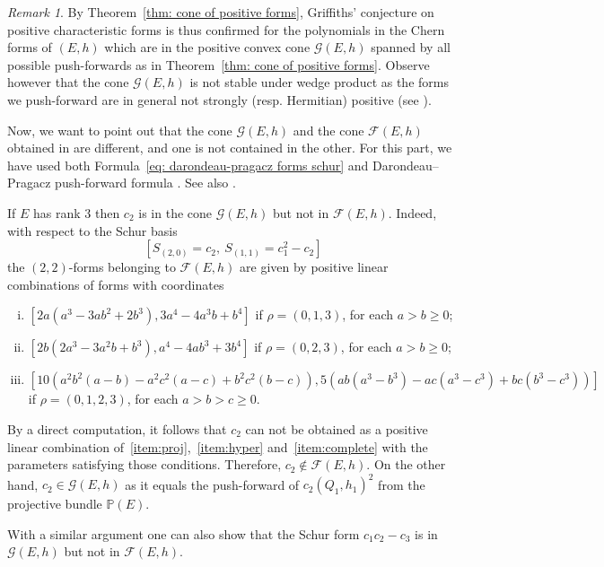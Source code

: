 \documentclass[a4paper]{amsart}
\theoremstyle{plain}%
\theoremstyle{definition}
\theoremstyle{remark}
\newtheorem{remark}[theorem]{Remark}
\newcommand{\PP}{\mathbb{P}}
\begin{document}
\begin{remark}
	By Theorem~\ref{thm: cone of positive forms}, Griffiths' conjecture on positive characteristic forms is thus confirmed for the polynomials in the Chern forms of $ (E,h) $ which are in the positive convex cone $ \mathcal{G}(E,h) $ spanned by all possible push-forwards as in Theorem~\ref{thm: cone of positive forms}.
	Observe however that the cone $ \mathcal{G}(E,h) $ is not stable under wedge product as the forms we push-forward are in general not strongly (resp. Hermitian) positive (see \cite[Section~{1.1}]{Fag20}).
\end{remark}

Now, we want to point out that the cone $ \mathcal{G}(E,h) $ and the cone $ \mathcal{F}(E,h) $ obtained in \cite[Theorem 4.8]{DF20} are different, and one is not contained in the other.
For this part, we have used both Formula~\eqref{eq: darondeau-pragacz forms schur} and Darondeau--Pragacz push-forward formula \cite[Proposition~{1.2}]{DP17}.
See also \cite[Formula~{(3.3)}]{DF20}.

If $ E $ has rank $ 3 $ then $ c_2 $ is in the cone $ \mathcal{G}(E,h) $ but not in $ \mathcal{F}(E,h) $.
Indeed, with respect to the Schur basis
\[
\left[ S_{(2,0)} = c_2, \  S_{(1,1)} = c_1^2 - c_2 \right]
\]
the $ (2,2) $-forms belonging to $ \mathcal{F}(E,h) $ are given by positive linear combinations of forms with coordinates
\begin{enumerate}[(i)]
	\item $ [2a(a^3 -3ab^2 +2b^3), 3a^4 -4a^3b + b^4] $ if $ \rho = (0,1,3) $, for each $ a > b \ge 0 $;\label{item:proj}
	\item $ [2b(2a^3 -3a^2b +b^3), a^4 -4ab^3 + 3b^4] $ if $ \rho = (0,2,3) $, for each $ a > b \ge 0 $;\label{item:hyper}
	\item $ [10( a^2b^2(a-b) -a^2c^2(a-c) +b^2c^2(b-c) ), 5( ab(a^3-b^3) -ac(a^3-c^3) +bc(b^3-c^3) )] $ if $ \rho = (0,1,2,3) $, for each $ a > b > c \ge 0 $.\label{item:complete}
\end{enumerate}
By a direct computation, it follows that $ c_2 $ can not be obtained as a positive linear combination of~\eqref{item:proj},~\eqref{item:hyper} and~\eqref{item:complete} with the parameters satisfying those conditions.
Therefore, $ c_2 \notin \mathcal{F}(E,h) $.
On the other hand, $ c_2 \in \mathcal{G}(E,h) $ as it equals the push-forward of $ c_2(Q_1,h_1)^2 $ from the projective bundle $ \PP(E) $.

With a similar argument one can also show that the Schur form $ c_1c_2 - c_3 $ is in $  \mathcal{G}(E,h) $ but not in $ \mathcal{F}(E,h) $.
\end{document}
